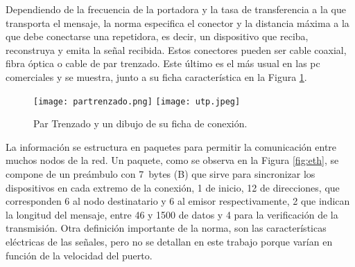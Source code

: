 
Dependiendo de la frecuencia de la portadora y la tasa de transferencia a la que transporta el mensaje, la norma especifica el conector y la distancia máxima a la que debe conectarse una repetidora, es decir, un dispositivo que reciba, reconstruya y emita la señal recibida. Estos conectores pueden ser cable coaxial, fibra óptica o cable de par trenzado. Este último es el más usual en las \acrshort{pc} comerciales y se muestra, junto a su ficha característica en la Figura \ref{fig:utp}.%

\begin{figure}[b]
	\centering
	\texttt{[image: partrenzado.png]}
	\texttt{[image: utp.jpeg]}
	\caption{Par Trenzado y un dibujo de su ficha de conexión.}
	\label{fig:utp}
\end{figure}

La información se estructura en paquetes para permitir la comunicación entre muchos nodos de la red. Un paquete, como se observa en la Figura \ref{fig:eth}, se compone de un preámbulo con \SI{7}{bytes} (B) que sirve para sincronizar los dispositivos en cada extremo de la conexión, \SI{1}{\byte} de inicio, \SI{12}{\byte} de direcciones, que corresponden 6 al nodo destinatario y 6 al emisor respectivamente, \SI{2}{\byte} que indican la longitud del mensaje, entre 46 y \SI{1500}{\byte} de datos y \SI{4}{\byte} para la verificación de la transmisión. Otra definición importante de la norma, son las características eléctricas de las señales, pero no se detallan en este trabajo porque varían en función de la velocidad del puerto.%


